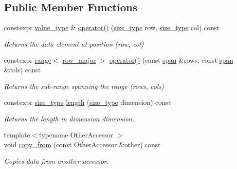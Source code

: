 \subsection*{Public Member Functions}
\begin{DoxyCompactItemize}
\item 
constexpr \hyperlink{classgko_1_1accessor_1_1row__major_a687bda931be92c31abf02965fa72ceba}{value\+\_\+type} \& \hyperlink{classgko_1_1accessor_1_1row__major_a669d87e6198b1bdb4c915b909a61f756}{operator()} (\hyperlink{namespacegko_a6e5c95df0ae4e47aab2f604a22d98ee7}{size\+\_\+type} row, \hyperlink{namespacegko_a6e5c95df0ae4e47aab2f604a22d98ee7}{size\+\_\+type} col) const
\begin{DoxyCompactList}\small\item\em Returns the data element at position (row, col) \end{DoxyCompactList}\item 
constexpr \hyperlink{classgko_1_1range}{range}$<$ \hyperlink{classgko_1_1accessor_1_1row__major}{row\+\_\+major} $>$ \hyperlink{classgko_1_1accessor_1_1row__major_ad1a38f9d96e849ae10de733809a3494d}{operator()} (const \hyperlink{structgko_1_1span}{span} \&rows, const \hyperlink{structgko_1_1span}{span} \&cols) const
\begin{DoxyCompactList}\small\item\em Returns the sub-\/range spanning the range (rows, cols) \end{DoxyCompactList}\item 
constexpr \hyperlink{namespacegko_a6e5c95df0ae4e47aab2f604a22d98ee7}{size\+\_\+type} \hyperlink{classgko_1_1accessor_1_1row__major_a438bb22bf86a33db403119bcb914dacc}{length} (\hyperlink{namespacegko_a6e5c95df0ae4e47aab2f604a22d98ee7}{size\+\_\+type} dimension) const
\begin{DoxyCompactList}\small\item\em Returns the length in dimension {\ttfamily dimension}. \end{DoxyCompactList}\item 
{\footnotesize template$<$typename Other\+Accessor $>$ }\\void \hyperlink{classgko_1_1accessor_1_1row__major_a878a175c452549107d9db2521e481efe}{copy\+\_\+from} (const Other\+Accessor \&other) const
\begin{DoxyCompactList}\small\item\em Copies data from another accessor. \end{DoxyCompactList}\end{DoxyCompactItemize}
